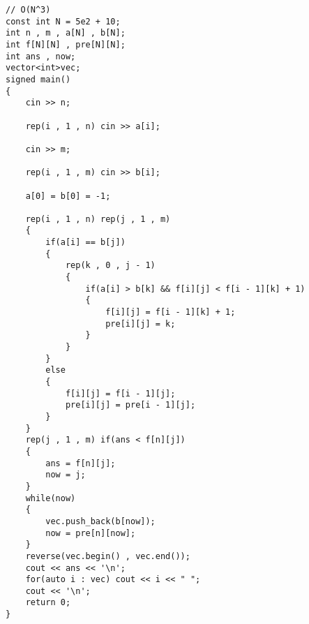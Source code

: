 \documentclass[C:/Users/12748/Desktop/latex模板/main/main.tex]{subfiles}
\begin{document}
\begin{lstlisting}
// O(N^3)
const int N = 5e2 + 10;
int n , m , a[N] , b[N];
int f[N][N] , pre[N][N];
int ans , now;
vector<int>vec;
signed main()
{
	cin >> n;
	
	rep(i , 1 , n) cin >> a[i];
	
	cin >> m;
	
	rep(i , 1 , m) cin >> b[i];
	
	a[0] = b[0] = -1;
	
	rep(i , 1 , n) rep(j , 1 , m) 
	{
		if(a[i] == b[j])
		{
			rep(k , 0 , j - 1)
			{
				if(a[i] > b[k] && f[i][j] < f[i - 1][k] + 1)
				{
					f[i][j] = f[i - 1][k] + 1;
					pre[i][j] = k;
				}
			}
		}
		else
		{
			f[i][j] = f[i - 1][j];
			pre[i][j] = pre[i - 1][j];
		}
	}
	rep(j , 1 , m) if(ans < f[n][j])
	{
		ans = f[n][j];
		now = j;
	}
	while(now)
	{
		vec.push_back(b[now]);
		now = pre[n][now];
	}
	reverse(vec.begin() , vec.end());
	cout << ans << '\n';
	for(auto i : vec) cout << i << " ";
	cout << '\n';
	return 0;
}
\end{lstlisting}
\end{document}

